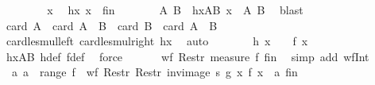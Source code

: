 \begin{isabellebody}
\ \ \isamarkupfalse%
{\isacharminus}{\kern0pt}\isanewline
\ \ \ \ \isamarkupfalse%
\ x\ \isamarkupfalse%
\ hx{\isacharcolon}{\kern0pt}\ {\isachardoublequoteopen}x\ {\isasymin}\ {\isacharquery}{\kern0pt}fin{\isachardoublequoteclose}\isanewline
\ \ \ \ \isamarkupfalse%
\ \isamarkupfalse%
\ A\ B\ \ hxAB{\isacharcolon}{\kern0pt}\ {\isachardoublequoteopen}x\ {\isacharequal}{\kern0pt}\ {\isacharparenleft}{\kern0pt}A{\isacharcomma}{\kern0pt}\ B{\isacharparenright}{\kern0pt}{\isachardoublequoteclose}\ \isamarkupfalse%
\ blast\isanewline
\ \ \ \ \isamarkupfalse%
\ \isamarkupfalse%
\ {\isachardoublequoteopen}card\ A\ {\isasymle}\ card\ {\isacharparenleft}{\kern0pt}A\ {\isasymcdots}\ B{\isacharparenright}{\kern0pt}{\isachardoublequoteclose}\ \ {\isachardoublequoteopen}card\ B\ {\isasymle}\ card\ {\isacharparenleft}{\kern0pt}A\ {\isasymcdots}\ B{\isacharparenright}{\kern0pt}{\isachardoublequoteclose}\ \isanewline
\ \ \ \ \ \ \isamarkupfalse%
\ card{\isacharunderscore}{\kern0pt}le{\isacharunderscore}{\kern0pt}smul{\isacharunderscore}{\kern0pt}left\ card{\isacharunderscore}{\kern0pt}le{\isacharunderscore}{\kern0pt}smul{\isacharunderscore}{\kern0pt}right\ hx\ \isamarkupfalse%
\ auto\isanewline
\ \ \ \ \isamarkupfalse%
\ \isamarkupfalse%
\ {\isachardoublequoteopen}h\ x\ {\isasymle}\ {}\ {\isacharasterisk}{\kern0pt}\ f\ x{\isachardoublequoteclose}\ \isamarkupfalse%
\ hxAB\ h{\isacharunderscore}{\kern0pt}def\ f{\isacharunderscore}{\kern0pt}def\ \isamarkupfalse%
\ force\isanewline
\ \ \isamarkupfalse%
\isanewline
\ \ \isamarkupfalse%
\ {\isachardoublequoteopen}wf\ {\isacharparenleft}{\kern0pt}Restr\ {\isacharparenleft}{\kern0pt}measure\ f{\isacharparenright}{\kern0pt}\ {\isacharquery}{\kern0pt}fin{\isacharparenright}{\kern0pt}{\isachardoublequoteclose}\ \isamarkupfalse%
\ {\isacharparenleft}{\kern0pt}simp\ add{\isacharcolon}{\kern0pt}\ wf{\isacharunderscore}{\kern0pt}Int{}{\isacharparenright}{\kern0pt}\isanewline
\ \ \isamarkupfalse%
\ \isamarkupfalse%
\ {\isachardoublequoteopen}{\isasymAnd}\ a{\isachardot}{\kern0pt}\ a\ {\isasymin}\ range\ f\ {\isasymLongrightarrow}\ wf\ {\isacharparenleft}{\kern0pt}Restr\ {\isacharparenleft}{\kern0pt}Restr\ {\isacharparenleft}{\kern0pt}inv{\isacharunderscore}{\kern0pt}image\ s\ g{\isacharparenright}{\kern0pt}\ {\isacharbraceleft}{\kern0pt}x{\isachardot}{\kern0pt}\ f\ x\ {\isacharequal}{\kern0pt}\ a{\isacharbraceright}{\kern0pt}{\isacharparenright}{\kern0pt}\ {\isacharquery}{\kern0pt}fin{\isacharparenright}{\kern0pt}{\isachardoublequoteclose}\isanewline

\end{isabellebody}

